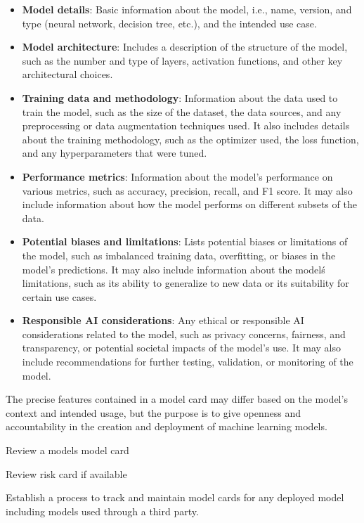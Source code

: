 \begin{itemize}
  \item \textbf{Model details}: Basic information about the model, i.e., name,
  version, and type (neural network, decision tree, etc.), and the intended use
  case.
  \item \textbf{Model architecture}: Includes a description of the structure of
  the model, such as the number and type of layers, activation functions, and
  other key architectural choices.
  \item \textbf{Training data and methodology}: Information about the data used
  to train the model, such as the size of the dataset, the data sources, and
  any preprocessing or data augmentation techniques used. It also includes
  details about the training methodology, such as the optimizer used, the loss
  function, and any hyperparameters that were tuned.
  \item \textbf{Performance metrics}: Information about the model's performance
  on various metrics, such as accuracy, precision, recall, and F1 score. It
  may also include information about how the model performs on different
  subsets of the data.
  \item \textbf{Potential biases and limitations}: Lists potential biases or
  limitations of the model, such as imbalanced training data, overfitting, or
  biases in the model's predictions. It may also include information about the
  model\'s limitations, such as its ability to generalize to new data or its
  suitability for certain use cases.
  \item \textbf{Responsible AI considerations}: Any ethical or responsible
  AI considerations related to the model, such as privacy concerns, fairness,
  and transparency, or potential societal impacts of the model's use. It may
  also include recommendations for further testing, validation, or monitoring
  of the model.
\end{itemize}

\clearpage

The precise features contained in a model card may differ based on the model's
context and intended usage, but the purpose is to give openness and
accountability in the creation and deployment of machine learning models.

\begin{minipage}{\linewidth}
\begin{checklist}
  \item Review a models model card
  \item Review risk card if available
  \item Establish a process to track and maintain model cards for any deployed
  model including models used through a third party.
\end{checklist}
\end{minipage}

